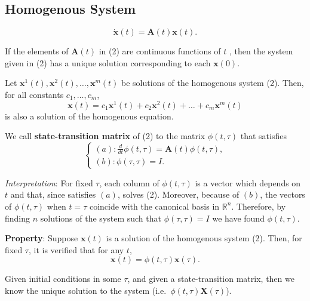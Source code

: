 \subsection{Homogenous System}


\[
    \dot{\mathbf{x}} (t) = \mathbf{A}(t)\mathbf{x}(t). \tag{2}
\]

\begin{proposition}
    If the elements of \(\mathbf{A}(t)\) in (2) are continuous functions of \(t\) , then the system given in (2) has a unique solution corresponding to each \(\mathbf{x}(0)\).
\end{proposition}

\begin{proposition}
    Let \(\mathbf{x}^{1}(t), \mathbf{x}^{2}(t), \ldots, \mathbf{x}^{m}(t)\) be solutions of the homogenous system (2). Then, for all constants \(c_{1}, \ldots, c_{m}\),
    \[
        \mathbf{x}(t) = c_{1}\mathbf{x}^{1}(t) + c_{2}\mathbf{x}^{2}(t) + \dots + c_{m}\mathbf{x}^{m}(t)
    \]
    is also a solution of the homogenous equation.
\end{proposition}

\begin{definition}
    We call \textbf{state-transition matrix} of (2) to the matrix \(\phi (t, \tau)\) that satisfies
    \[
        \left\{ \begin{array}{ll}(a):\frac{d}{dt}\phi (t,\tau) = \mathbf{A}(t)\phi (t,\tau),\\ (b):\phi (\tau ,\tau) = I. \end{array} \right.
    \]

    \textit{Interpretation}: For fixed \(\tau\), each column of \(\phi (t, \tau)\) is a vector which depends on \(t\) and that, since satisfies \((a)\), solves (2). Moreover, because of \((b)\), the vectors of \(\phi (t, \tau)\) when \(t = \tau\) coincide with the canonical basis in \(\mathbb{R}^{n}\). Therefore, by finding \(n\) solutions of the system such that \(\phi (\tau , \tau) = I\) we have found \(\phi (t, \tau)\).

    \textbf{Property}: Suppose \(\mathbf{x}(t)\) is a solution of the homogenous system (2). Then, for fixed \(\tau\), it is verified that for any \(t\),
    \[
        \mathbf{x}(t) = \phi (t,\tau)\mathbf{x}(\tau).
    \]
\end{definition}

\begin{remark*}
    Given initial conditions in some \(\tau\), and given a   state-transition matrix, then we know the unique solution to the system (i.e.~\(\phi (t, \tau) \mathbf{X}(\tau)\)).
\end{remark*}


